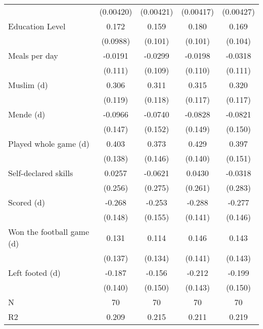 {\begin{tabular}{l*{4}{c}}
                    &   (0.00420)         &   (0.00421)         &   (0.00417)         &   (0.00427)         \\
[1em]
Education Level     &       0.172\sym{*}  &       0.159         &       0.180\sym{*}  &       0.169         \\
                    &    (0.0988)         &     (0.101)         &     (0.101)         &     (0.104)         \\
[1em]
Meals per day       &     -0.0191         &     -0.0299         &     -0.0198         &     -0.0318         \\
                    &     (0.111)         &     (0.109)         &     (0.110)         &     (0.111)         \\
[1em]
Muslim (d)          &       0.306\sym{**} &       0.311\sym{***}&       0.315\sym{***}&       0.320\sym{***}\\
                    &     (0.119)         &     (0.118)         &     (0.117)         &     (0.117)         \\
[1em]
Mende (d)           &     -0.0966         &     -0.0740         &     -0.0828         &     -0.0821         \\
                    &     (0.147)         &     (0.152)         &     (0.149)         &     (0.150)         \\
[1em]
Played whole game (d)&       0.403\sym{***}&       0.373\sym{**} &       0.429\sym{***}&       0.397\sym{***}\\
                    &     (0.138)         &     (0.146)         &     (0.140)         &     (0.151)         \\
[1em]
Self-declared skills&      0.0257         &     -0.0621         &      0.0430         &     -0.0318         \\
                    &     (0.256)         &     (0.275)         &     (0.261)         &     (0.283)         \\
[1em]
Scored (d)          &      -0.268\sym{*}  &      -0.253         &      -0.288\sym{**} &      -0.277\sym{*}  \\
                    &     (0.148)         &     (0.155)         &     (0.141)         &     (0.146)         \\
[1em]
Won the football game (d)&       0.131         &       0.114         &       0.146         &       0.143         \\
                    &     (0.137)         &     (0.134)         &     (0.141)         &     (0.143)         \\
[1em]
Left footed (d)     &      -0.187         &      -0.156         &      -0.212         &      -0.199         \\
                    &     (0.140)         &     (0.150)         &     (0.143)         &     (0.150)         \\
\hline
N                   &          70         &          70         &          70         &          70         \\
R2                  &       0.209         &       0.215         &       0.211         &       0.219         \\
\hline\hline
\end{tabular}
}

